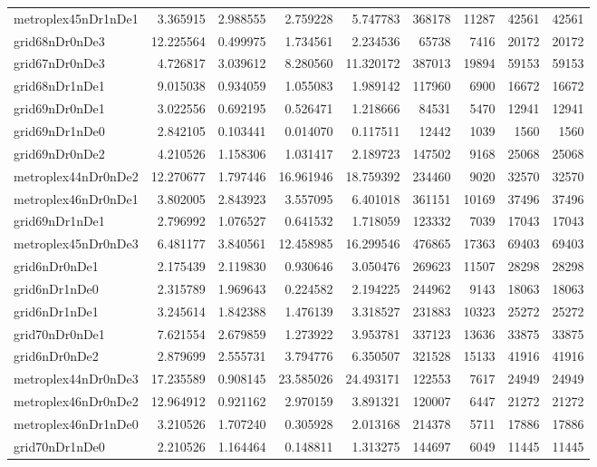 \documentclass[../../../thesis.tex]{subfiles}
\begin{document}
\begin{longtable}{|l|r|r|r|r|r|r|r|r|}
metroplex45nDr1nDe1 & 3.365915 & 2.988555 & 2.759228 & 5.747783 & 368178 & 11287 & 42561 & 42561 \\
grid68nDr0nDe3 & 12.225564 & 0.499975 & 1.734561 & 2.234536 & 65738 & 7416 & 20172 & 20172 \\
grid67nDr0nDe3 & 4.726817 & 3.039612 & 8.280560 & 11.320172 & 387013 & 19894 & 59153 & 59153 \\
grid68nDr1nDe1 & 9.015038 & 0.934059 & 1.055083 & 1.989142 & 117960 & 6900 & 16672 & 16672 \\
grid69nDr0nDe1 & 3.022556 & 0.692195 & 0.526471 & 1.218666 & 84531 & 5470 & 12941 & 12941 \\
grid69nDr1nDe0 & 2.842105 & 0.103441 & 0.014070 & 0.117511 & 12442 & 1039 & 1560 & 1560 \\
grid69nDr0nDe2 & 4.210526 & 1.158306 & 1.031417 & 2.189723 & 147502 & 9168 & 25068 & 25068 \\
metroplex44nDr0nDe2 & 12.270677 & 1.797446 & 16.961946 & 18.759392 & 234460 & 9020 & 32570 & 32570 \\
metroplex46nDr0nDe1 & 3.802005 & 2.843923 & 3.557095 & 6.401018 & 361151 & 10169 & 37496 & 37496 \\
grid69nDr1nDe1 & 2.796992 & 1.076527 & 0.641532 & 1.718059 & 123332 & 7039 & 17043 & 17043 \\
metroplex45nDr0nDe3 & 6.481177 & 3.840561 & 12.458985 & 16.299546 & 476865 & 17363 & 69403 & 69403 \\
grid6nDr0nDe1 & 2.175439 & 2.119830 & 0.930646 & 3.050476 & 269623 & 11507 & 28298 & 28298 \\
grid6nDr1nDe0 & 2.315789 & 1.969643 & 0.224582 & 2.194225 & 244962 & 9143 & 18063 & 18063 \\
grid6nDr1nDe1 & 3.245614 & 1.842388 & 1.476139 & 3.318527 & 231883 & 10323 & 25272 & 25272 \\
grid70nDr0nDe1 & 7.621554 & 2.679859 & 1.273922 & 3.953781 & 337123 & 13636 & 33875 & 33875 \\
grid6nDr0nDe2 & 2.879699 & 2.555731 & 3.794776 & 6.350507 & 321528 & 15133 & 41916 & 41916 \\
metroplex44nDr0nDe3 & 17.235589 & 0.908145 & 23.585026 & 24.493171 & 122553 & 7617 & 24949 & 24949 \\
metroplex46nDr0nDe2 & 12.964912 & 0.921162 & 2.970159 & 3.891321 & 120007 & 6447 & 21272 & 21272 \\
metroplex46nDr1nDe0 & 3.210526 & 1.707240 & 0.305928 & 2.013168 & 214378 & 5711 & 17886 & 17886 \\
grid70nDr1nDe0 & 2.210526 & 1.164464 & 0.148811 & 1.313275 & 144697 & 6049 & 11445 & 11445 \\

\end{longtable}
\end{document}
